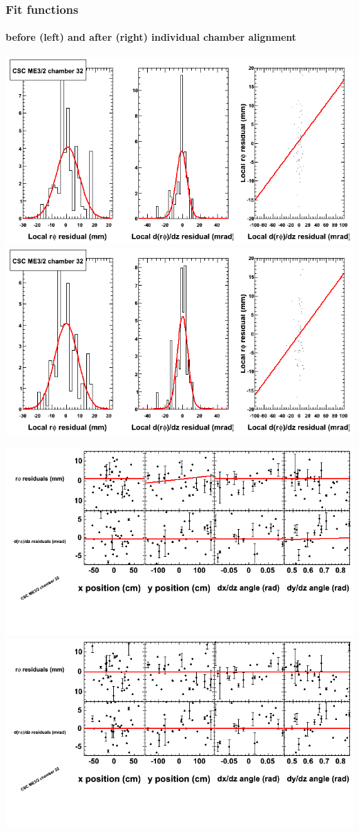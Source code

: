 \documentclass[compress]{beamer}
\begin{document}
\begin{frame}
\frametitle{Fit functions}
\framesubtitle{before (left) and after (right) individual chamber alignment}
\includegraphics[width=0.5\linewidth]{ringfits_3dof/beforefit_MEp32_32_bellcurve.png} \includegraphics[width=0.5\linewidth]{ringfits_3dof/afterfit_MEp32_32_bellcurve.png}

\includegraphics[width=0.5\linewidth]{ringfits_3dof/beforefit_MEp32_32_polynomials.png} \includegraphics[width=0.5\linewidth]{ringfits_3dof/afterfit_MEp32_32_polynomials.png}
\end{frame}
\end{document}

